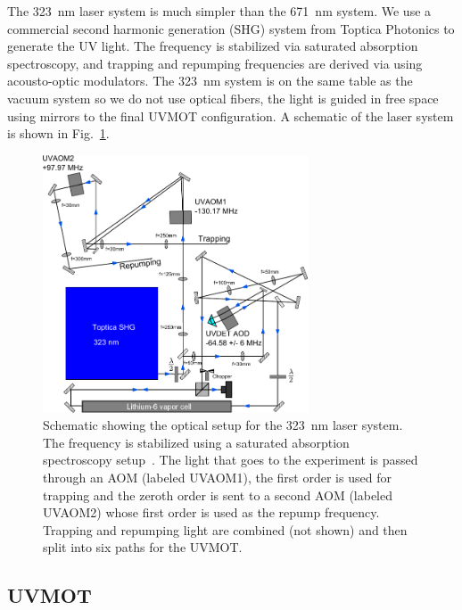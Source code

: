 The 323~nm laser system is much simpler than the 671~nm system.  We use a
commercial second harmonic generation (SHG) system from Toptica Photonics to
generate the UV light.  The frequency is stabilized via saturated absorption
spectroscopy, and trapping and repumping frequencies are derived via using
acousto-optic modulators.  The 323~nm system is on the same table as the vacuum
system so we do not use optical fibers,  the light is guided in free space
using mirrors to the final UVMOT configuration.  A schematic of the laser
system is shown in Fig.~\ref{fig:323setupfig}. 
\begin{figure} \centering
\includegraphics[width=0.7\textwidth]{../masters-figures/323setup/aomsetup/optical_setup.pdf}
\caption[Schematic of modulation transfer spectroscopy]{\small Schematic
showing the optical setup for the 323~nm laser system.   The frequency is
stabilized using a saturated absorption spectroscopy setup~\cite{DuarteMs}.
The light that goes to the experiment is passed through an AOM (labeled
UVAOM1),  the first order is used for trapping and the zeroth order is sent to
a second AOM (labeled UVAOM2) whose first order is used as the repump
frequency.  Trapping and repumping light are combined (not shown) and then
split into six paths for the UVMOT.}
\label{fig:323setupfig}  
\end{figure}


\subsection{UVMOT}

